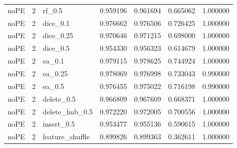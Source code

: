 \documentclass[UTF8,a4paper,11pt,fontset=fandol]{ctexart}
\begin{document}
{\begin{longtable}{lrlrrrr}
noPE & 2 & rf\_0.5 & 0.959196 & 0.961694 & 0.665062 & 1.000000 \\
noPE & 2 & dice\_0.1 & 0.976662 & 0.976506 & 0.726425 & 1.000000 \\
noPE & 2 & dice\_0.25 & 0.970646 & 0.971215 & 0.698000 & 1.000000 \\
noPE & 2 & dice\_0.5 & 0.954330 & 0.956323 & 0.614679 & 1.000000 \\
noPE & 2 & ea\_0.1 & 0.979115 & 0.978625 & 0.744924 & 1.000000 \\
noPE & 2 & ea\_0.25 & 0.978069 & 0.976998 & 0.733043 & 0.990000 \\
noPE & 2 & ea\_0.5 & 0.976455 & 0.975022 & 0.716198 & 0.990000 \\
noPE & 2 & delete\_0.5 & 0.966809 & 0.967609 & 0.668371 & 1.000000 \\
noPE & 2 & delete\_hub\_0.5 & 0.972220 & 0.972005 & 0.700556 & 1.000000 \\
noPE & 2 & insert\_0.5 & 0.953477 & 0.955136 & 0.590615 & 1.000000 \\
noPE & 2 & feature\_shuffle & 0.899826 & 0.899363 & 0.362611 & 1.000000 \\
\end{longtable}
}
\end{document}
